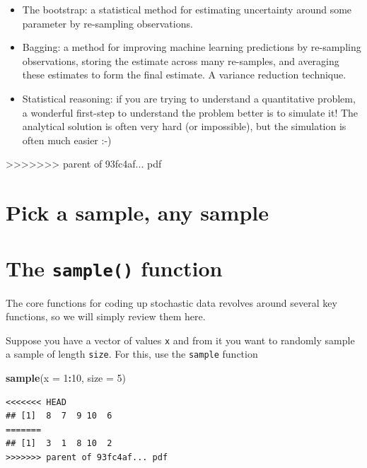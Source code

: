\documentclass[]{book}
\newenvironment{Shaded}{\begin{snugshade}}{\end{snugshade}}
\newcommand{\DataTypeTok}[1]{\textcolor[rgb]{0.13,0.29,0.53}{#1}}
\newcommand{\DecValTok}[1]{\textcolor[rgb]{0.00,0.00,0.81}{#1}}
\newcommand{\KeywordTok}[1]{\textcolor[rgb]{0.13,0.29,0.53}{\textbf{#1}}}
\newcommand{\NormalTok}[1]{#1}
\newcommand{\OperatorTok}[1]{\textcolor[rgb]{0.81,0.36,0.00}{\textbf{#1}}}
\providecommand{\tightlist}{%
  \setlength{\itemsep}{0pt}\setlength{\parskip}{0pt}}
\theoremstyle{definition}
\theoremstyle{definition}
\theoremstyle{definition}
\theoremstyle{remark}
\begin{document}
\begin{Shaded}
\begin{Highlighting}[]
\begin{Shaded}
\begin{Highlighting}[]
\begin{Shaded}
\begin{Highlighting}[]
\begin{itemize}
\tightlist
\item
  The bootstrap: a statistical method for estimating uncertainty around some parameter by re-sampling observations.
\item
  Bagging: a method for improving machine learning predictions by re-sampling observations, storing the estimate across many re-samples, and averaging these estimates to form the final estimate. A variance reduction technique.
\item
  Statistical reasoning: if you are trying to understand a quantitative problem, a wonderful first-step to understand the problem better is to simulate it! The analytical solution is often very hard (or impossible), but the simulation is often much easier :-)
\end{itemize}

>>>>>>> parent of 93fc4af... pdf
\hypertarget{pick-a-sample-any-sample}{%
\section{Pick a sample, any sample}\label{pick-a-sample-any-sample}}

\hypertarget{the-sample-function}{%
\section{\texorpdfstring{The \texttt{sample()} function}{The sample() function}}\label{the-sample-function}}

The core functions for coding up stochastic data revolves around several key functions, so we will simply review them here.

Suppose you have a vector of values \texttt{x} and from it you want to randomly sample a sample of length \texttt{size}. For this, use the \texttt{sample} function

\begin{Shaded}
\begin{Highlighting}[]
\KeywordTok{sample}\NormalTok{(}\DataTypeTok{x =} \DecValTok{1}\OperatorTok{:}\DecValTok{10}\NormalTok{, }\DataTypeTok{size =} \DecValTok{5}\NormalTok{)}
\end{Highlighting}
\end{Shaded}

\begin{verbatim}
<<<<<<< HEAD
## [1]  8  7  9 10  6
=======
## [1]  3  1  8 10  2
>>>>>>> parent of 93fc4af... pdf
\end{verbatim}


\end{Highlighting}
\end{Shaded}
\end{Highlighting}
\end{Shaded}
\end{Highlighting}
\end{Shaded}
\end{document}
